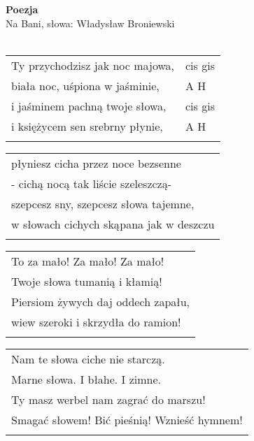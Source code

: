 \documentclass[a5paper]{article}
\begin{document}


\noindent
\noindent
\fontsize{12pt}{15pt}\selectfont
\textbf{Poezja} \\
\fontsize{8pt}{10pt}\selectfont
Na Bani, słowa: Władysław Broniewski \\ \\
\fontsize{10pt}{12pt}\selectfont
{}
\begin{tabular}{@{}p{7.50cm}p{3cm}@{}}
\noindent
Ty przychodzisz jak noc majowa, & cis gis \\
biała noc, uśpiona w jaśminie, & A H \\
i jaśminem pachną twoje słowa, & cis gis \\
i księżycem sen srebrny płynie, & A H \\ \\
\end{tabular}

\noindent
\begin{tabular}{@{}p{7.50cm}@{}}
płyniesz cicha przez noce bezsenne \\
- cichą nocą tak liście szeleszczą- \\
szepcesz sny, szepcesz słowa tajemne, \\
w słowach cichych skąpana jak w deszczu \\ \\
\end{tabular}

\noindent
\begin{tabular}{@{}p{7.50cm}@{}}
To za mało! Za mało! Za mało! \\ 
Twoje słowa tumanią i kłamią! \\
Piersiom żywych daj oddech zapału, \\
wiew szeroki i skrzydła do ramion! \\ \\
\end{tabular}

\noindent
\begin{tabular}{@{}p{7.50cm}@{}}
Nam te słowa ciche nie starczą. \\ 
Marne słowa. I błahe. I zimne. \\
Ty masz werbel nam zagrać do marszu! \\
Smagać słowem! Bić pieśnią! Wznieść hymnem! \\ \\
\end{tabular}
\end{document}
